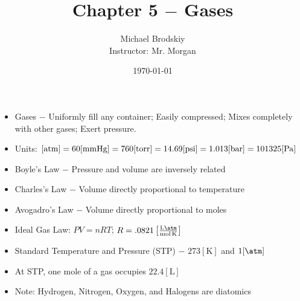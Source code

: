 \documentclass[12pt]{article}
\title{Chapter 5 $-$ Gases}
\date{\today}
\author{Michael Brodskiy\\ \small Instructor: Mr. Morgan}
\begin{document}
\maketitle

\begin{itemize}

  \item Gases $-$ Uniformly fill any container; Easily compressed; Mixes completely with other gases; Exert pressure.

  \item Units: $[\si{atm}]=60[\si{\milli\meter}\ce{Hg}]=760[\si{torr}]=14.69[\si{psi}]=1.013[\si{bar}]=101325[\si{\pascal}]$

  \item Boyle's Law $-$ Pressure and volume are inversely related

  \item Charles's Law $-$ Volume directly proportional to temperature

  \item Avogadro's Law $-$ Volume directly proportional to moles

  \item Ideal Gas Law: $PV=nRT$; $R=.0821\left[ \frac{\si{\liter\atm}}{\si{\mole\kelvin}} \right]$

  \item Standard Temperature and Pressure (STP) $-$ $273[\si{\kelvin}]$ and $1[\si{\atm}]$

  \item At STP, one mole of a gas occupies $22.4[\si{\liter}]$

  \item Note: Hydrogen, Nitrogen, Oxygen, and Halogens are diatomics

\end{itemize}
\end{document}
